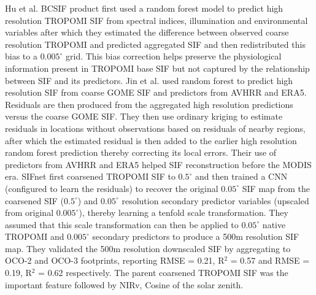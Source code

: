 Hu et al. \cite{hu2024spatially} BCSIF product first used a random forest model to predict high resolution TROPOMI SIF from spectral indices, illumination and environmental variables after which they estimated the difference between observed coarse resolution TROPOMI and predicted aggregated SIF and then redistributed this bias to a $0.005^{\circ}$ grid. This bias correction helps preserve the physiological information present in TROPOMI base SIF but not captured by the relationship between SIF and its predictors. Jin et al. \cite{jin2024downscaling} used random forest to predict high resolution SIF from coarse GOME SIF and predictors from AVHRR and ERA5. Residuals are then produced from the aggregated high resolution predictions versus the coarse GOME SIF. They then use ordinary kriging to estimate residuals in locations without observations based on residuals of nearby regions, after which the estimated residual is then added to the earlier high resolution random forest prediction thereby correcting its local errors. Their use of predictors from AVHRR and ERA5 helped SIF reconstruction before the MODIS era. SIFnet \cite{gensheimer2022convolutional} first coarsened TROPOMI SIF to $0.5^{\circ}$ and then trained a CNN (configured to learn the residuals) to recover the original $0.05^{\circ}$ SIF map from the coarsened SIF ($0.5^{\circ}$) and $0.05^{\circ}$ resolution secondary predictor variables (upscaled from original $0.005^{\circ}$), thereby learning a tenfold scale transformation. They assumed that this scale transformation can then be applied to $0.05^{\circ}$ native TROPOMI and $0.005^{\circ}$ secondary predictors to produce a 500m resolution SIF map. They validated the 500m resolution downscaled SIF by aggregating to OCO-2 and OCO-3 footprints, reporting RMSE = 0.21, R$^2$ = 0.57 and RMSE = 0.19, R$^2$ = 0.62 respectively. The parent coarsened TROPOMI SIF was the important feature followed by NIRv, Cosine of the solar zenith. 

